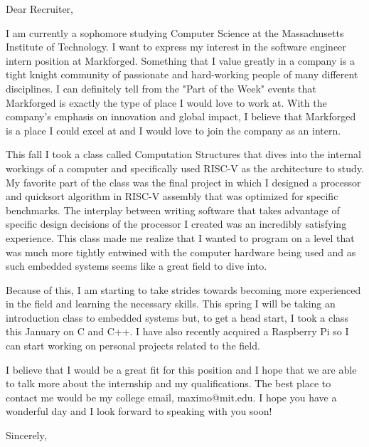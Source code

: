 \documentclass[12pt]{letter}
\begin{document}
\begin{letter}{}
    \opening{Dear Recruiter,}
    I am currently a sophomore studying Computer Science at the Massachusetts Institute of Technology.
    I want to express my interest in the software engineer intern position at Markforged.
    Something that I value greatly in a company is a tight knight community of passionate and hard-working people of many different disciplines.
    I can definitely tell from the "Part of the Week" events that Markforged is exactly the type of place I would love to work at.
    With the company's emphasis on innovation and global impact, I believe that Markforged is a place I could excel at and I would love to join the company as an intern.

    This fall I took a class called Computation Structures that dives into the internal workings of a computer and specifically used RISC-V as the architecture to study.
    My favorite part of the class was the final project in which I designed a processor and quicksort algorithm in RISC-V assembly that was optimized for specific benchmarks.
    The interplay between writing software that takes advantage of specific design decisions of the processor I created was an incredibly satisfying experience.
    This class made me realize that I wanted to program on a level that was much more tightly entwined with the computer hardware being used and as such embedded systems seems like a great field to dive into.

    Because of this, I am starting to take strides towards becoming more experienced in the field and learning the necessary skills.
    This spring I will be taking an introduction class to embedded systems but, to get a head start, I took a class this January on C and C++.
    I have also recently acquired a Raspberry Pi so I can start working on personal projects related to the field.

    I believe that I would be a great fit for this position and I hope that we are able to talk more about the internship and my qualifications.
    The best place to contact me would be my college email, maximo@mit.edu. I hope you have a wonderful day and I look forward to speaking with you soon!
    \closing{Sincerely,}
\end{letter}
\end{document}
